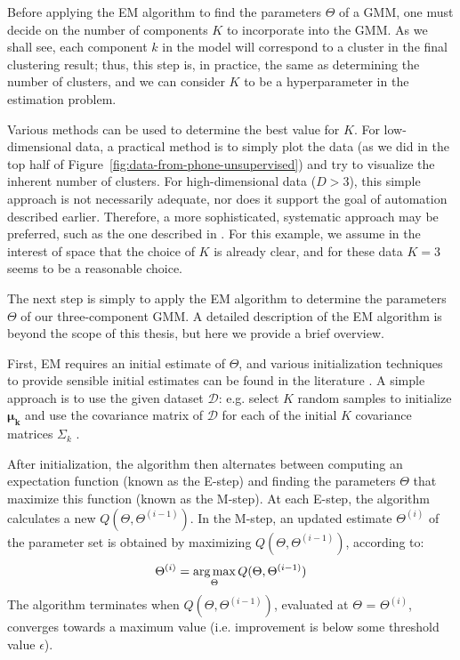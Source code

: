Before applying the EM algorithm to find the parameters $\Theta$ of a GMM, one must decide on the number of components $K$ to incorporate into the GMM. As we shall see, each component $k$ in the model will correspond to a cluster in the final clustering result; thus, this step is, in practice, the same as determining the number of clusters, and we can consider $K$ to be a hyperparameter in the estimation problem.

Various methods can be used to determine the best value for $K$. For low-dimensional data, a practical method is to simply plot the data (as we did in the top half of Figure~\ref{fig:data-from-phone-unsupervised}) and try to visualize the inherent number of clusters. For high-dimensional data ($D>3$), this simple approach is not necessarily adequate, nor does it support the goal of automation described earlier. Therefore, a more sophisticated, systematic approach may be preferred, such as the one described in \cite{vlassis2002greedy}. For this example, we assume in the interest of space that the choice of $K$ is already clear, and for these data $K=3$ seems to be a reasonable choice.

The next step is simply to apply the EM algorithm to determine the parameters $\Theta$ of our three-component GMM. A detailed description of the EM algorithm is beyond the scope of this thesis, but here we provide a brief overview.

First, EM requires an initial estimate of $\Theta$, and various initialization techniques to provide sensible initial estimates can be found in the literature . A simple approach is to use the given dataset $\mathcal{D}$: e.g. select $K$ random samples to initialize $\boldsymbol{\mu_k}$ and use the covariance matrix of $\mathcal{D}$ for each of the initial $K$ covariance matrices $\Sigma_k$ \cite{Smyth2015}.

After initialization, the algorithm then alternates between computing an expectation function (known as the E-step) and finding the parameters $\Theta$ that maximize this function (known as the M-step). At each E-step, the algorithm calculates a new $Q(\Theta,\Theta^{(i-1)})$. In the M-step, an updated estimate $\Theta^{(i)}$ of the parameter set is obtained by maximizing $Q(\Theta,\Theta^{(i-1)})$, according to:
%
\begin{equation}
 \Theta^{(i)} = \operatorname*{arg\,max}_\Theta{Q(\Theta,\Theta^{(i-1)})}
\end{equation}
%
The algorithm terminates when $Q(\Theta,\Theta^{(i-1)})$, evaluated at $\Theta$ = $\Theta^{(i)}$, converges towards a maximum value (i.e. improvement is below some threshold value $\epsilon$).

